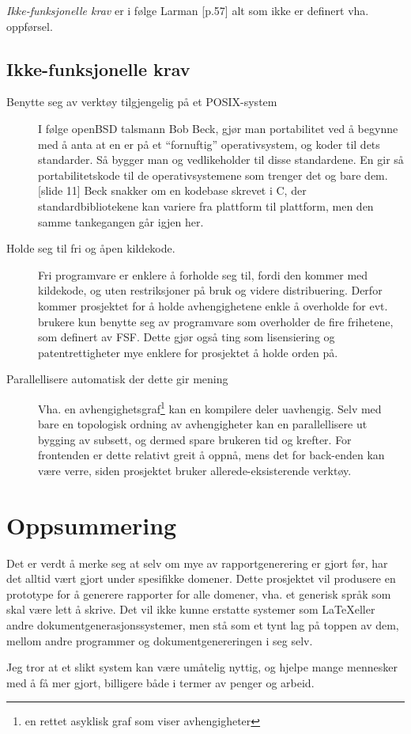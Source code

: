 \documentclass[11pt]{article}
\begin{document}
\emph{Ikke-funksjonelle krav} er i følge Larman \cite{Larman2005}[p.57] alt som ikke er definert vha. oppførsel.

\subsection{Ikke-funksjonelle krav}
\label{subsec:ikke-funksjonelle-krav}
\begin{description}
\item [Benytte seg av verktøy tilgjengelig på et POSIX-system]
  I følge openBSD talsmann Bob Beck,
  gjør man portabilitet ved å begynne med å anta at en er på et ``fornuftig'' operativsystem,
  og koder til dets standarder.
  Så bygger man og vedlikeholder til disse standardene.
  En gir så portabilitetskode til de operativsystemene som trenger det og bare dem. \cite{openbsd-bsdcan2014-libressl}[slide 11]
  Beck snakker om en kodebase skrevet i C, der standardbibliotekene kan variere fra plattform til plattform, men den samme tankegangen går igjen her.
\item [Holde seg til fri og åpen kildekode.]
  Fri programvare er enklere å forholde seg til, fordi den kommer med kildekode, og uten restriksjoner på bruk og videre distribuering.\cite{GNU-MANIFESTO}
  Derfor kommer prosjektet for å holde avhengighetene enkle å overholde for evt. brukere kun benytte seg av programvare som overholder de fire frihetene, som definert av FSF.
  Dette gjør også ting som lisensiering og patentrettigheter mye enklere for prosjektet å holde orden på.
\item [Parallellisere automatisk der dette gir mening]
  Vha. en avhengighetsgraf\footnote{en rettet asyklisk graf som viser avhengigheter} kan en kompilere deler uavhengig.
  Selv med bare en topologisk ordning av avhengigheter kan en parallellisere ut bygging av subsett,
  og dermed spare brukeren tid og krefter.
  For frontenden er dette relativt greit å oppnå, mens det for back-enden kan være verre,
  siden prosjektet bruker allerede-eksisterende verktøy.
\end{description}

\section{Oppsummering}
Det er verdt å merke seg at selv om mye av rapportgenerering er gjort før, har det alltid vært gjort under spesifikke domener. Dette prosjektet vil produsere en prototype for å generere rapporter for alle domener, vha. et generisk språk som skal være lett å skrive.
Det vil ikke kunne erstatte systemer som \LaTeX  eller andre dokumentgenerasjonssystemer, men stå som et tynt lag på toppen av dem, mellom andre programmer og dokumentgenereringen i seg selv.

Jeg tror at et slikt system kan være umåtelig nyttig, og hjelpe mange mennesker med å få mer gjort, billigere både i termer av penger og arbeid.

{}    

\end{document}
